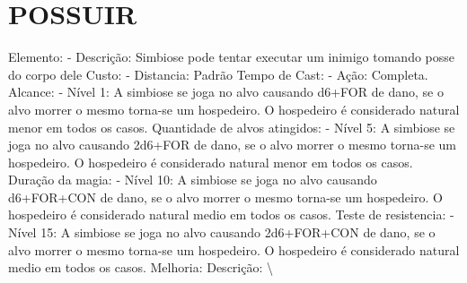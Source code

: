 \documentclass{article}%
\begin{document}
\section{POSSUIR}%
\label{sec:POSSUIR}%
Elemento: {-} Descrição: Simbiose pode tentar executar um inimigo tomando posse do corpo dele\newline%
Custo: {-} Distancia: Padrão\newline%
Tempo de Cast: {-} Ação: Completa.\newline%
Alcance: {-} Nível 1: A simbiose se joga no alvo causando d6+FOR de dano, se o alvo morrer o mesmo torna{-}se um hospedeiro. O hospedeiro é considerado natural menor em todos os casos.\newline%
Quantidade de alvos atingidos: {-} Nível 5: A simbiose se joga no alvo causando 2d6+FOR de dano, se o alvo morrer o mesmo torna{-}se um hospedeiro. O hospedeiro é considerado natural menor em todos os casos.\newline%
Duração da magia: {-} Nível 10: A simbiose se joga no alvo causando d6+FOR+CON de dano, se o alvo morrer o mesmo torna{-}se um hospedeiro. O hospedeiro é considerado natural medio em todos os casos.\newline%
Teste de resistencia: {-} Nível 15: A simbiose se joga no alvo causando 2d6+FOR+CON de dano, se o alvo morrer o mesmo torna{-}se um hospedeiro. O hospedeiro é considerado natural medio em todos os casos.\newline%
Melhoria: \newline%
Descrição: \textbackslash{}

%
\end{document}
